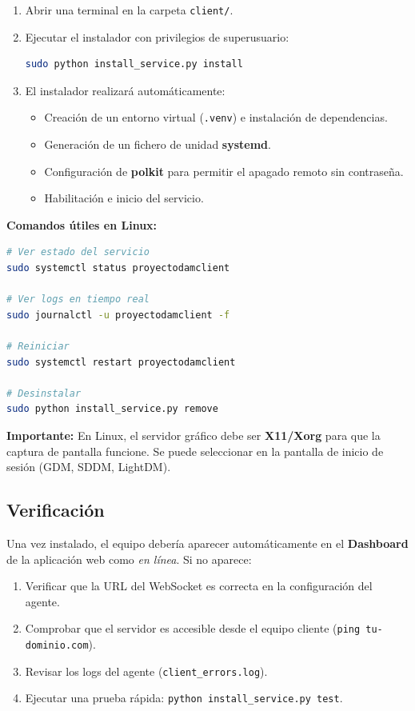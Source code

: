 \documentclass[12pt,a4paper]{article}
\begin{document}
\begin{enumerate}
    \item Abrir una terminal en la carpeta \texttt{client/}.
    \item Ejecutar el instalador con privilegios de superusuario:

\begin{lstlisting}[language=bash]
sudo python install_service.py install
\end{lstlisting}

    \item El instalador realizará automáticamente:
    \begin{itemize}
        \item Creación de un entorno virtual (\texttt{.venv}) e instalación de dependencias.
        \item Generación de un fichero de unidad \textbf{systemd}.
        \item Configuración de \textbf{polkit} para permitir el apagado remoto sin contraseña.
        \item Habilitación e inicio del servicio.
    \end{itemize}
\end{enumerate}

\textbf{Comandos útiles en Linux:}

\begin{lstlisting}[language=bash]
# Ver estado del servicio
sudo systemctl status proyectodamclient

# Ver logs en tiempo real
sudo journalctl -u proyectodamclient -f

# Reiniciar
sudo systemctl restart proyectodamclient

# Desinstalar
sudo python install_service.py remove
\end{lstlisting}

\textbf{Importante:} En Linux, el servidor gráfico debe ser \textbf{X11/Xorg} para que la captura de pantalla funcione. Se puede seleccionar en la pantalla de inicio de sesión (GDM, SDDM, LightDM).

\subsection{Verificación}

Una vez instalado, el equipo debería aparecer automáticamente en el \textbf{Dashboard} de la aplicación web como \textit{en línea}. Si no aparece:

\begin{enumerate}
    \item Verificar que la URL del WebSocket es correcta en la configuración del agente.
    \item Comprobar que el servidor es accesible desde el equipo cliente (\texttt{ping tu-dominio.com}).
    \item Revisar los logs del agente (\texttt{client\_errors.log}).
    \item Ejecutar una prueba rápida: \texttt{python install\_service.py test}.
\end{enumerate}
\end{document}

